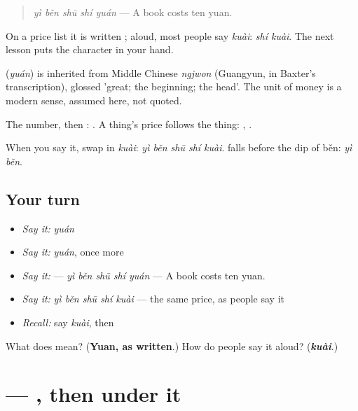 \begin{quote}
\textbf{} \emph{yì běn shū shí yuán} — A book costs ten yuan.
\end{quote}

On a price list it is written ; aloud, most people say \emph{kuài}: \emph{shí kuài}. The next lesson puts the character in your hand.

\begin{cousinweb}
\textbf{} (\emph{yuán}) is inherited from Middle Chinese \emph{ngjwon} (Guangyun, in Baxter's transcription), glossed 'great; the beginning; the head'. The unit of money is a modern sense, assumed here, not quoted.
\end{cousinweb}

\begin{grammarlens}[title={What you've built}]
The number, then : . A thing's price follows the thing: , .

When you say it, swap in \emph{kuài}: \emph{yì běn shū shí kuài}.  falls before the dip of běn: \emph{yì běn}.
\end{grammarlens}

\subsection*{Your turn}
\begin{itemize}
\raggedright
  \item \emph{Say it:} \emph{yuán}
  \item \emph{Say it:} \emph{yuán}, once more
  \item \emph{Say it:}  — \emph{yì běn shū shí yuán} — A book costs ten yuan.
  \item \emph{Say it:} \emph{yì běn shū shí kuài} — the same price, as people say it
  \item \emph{Recall:} say \emph{kuài}, then 
\end{itemize}

\begin{tcolorbox}[breakable,colback=teal!4,colframe=teal!35!black,title={Before you move on}]
What does  mean? (\textbf{Yuan, as written}.) How do people say it aloud? (\emph{\textbf{kuài}}.)
\end{tcolorbox}
\section[\texorpdfstring{\zh{元} (yuán)}{元 (yuán)}]{ — , then  under it}


